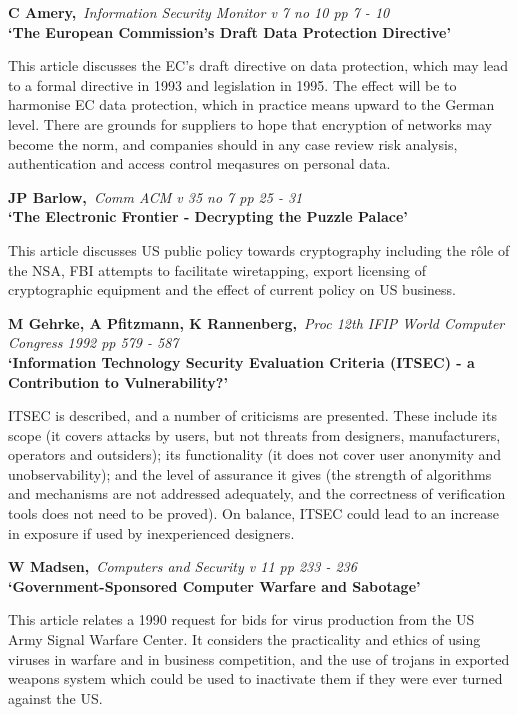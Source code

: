 {\bf \noindent C Amery,}{\em ~Information Security Monitor v 7 no 10 pp 7 -
10\\}
{\bf `The European Commission's Draft Data Protection Directive'}

This article discusses the EC's draft directive on data protection, which may
lead to a formal directive in 1993 and legislation in 1995. The effect will be
to harmonise EC data protection, which in practice means upward to the 
German level. There are grounds for suppliers to hope that encryption of
networks may become the norm, and companies should in any case review risk 
analysis, authentication and access control meqasures on personal data.

{\bf \noindent JP Barlow,}{\em ~Comm ACM v 35 no 7 pp 25 - 31\\}
{\bf `The Electronic Frontier - Decrypting the Puzzle Palace'}

This article discusses US public policy towards cryptography including the
r\^{o}le of the NSA, FBI attempts to facilitate wiretapping, export licensing
of cryptographic equipment and the effect of current policy on US business.

{\bf \noindent M Gehrke, A Pfitzmann, K Rannenberg,}{\em ~Proc 12th IFIP
World Computer Congress 1992 pp 579 - 587\\}
{\bf `Information Technology Security Evaluation Criteria (ITSEC) - a
Contribution to Vulnerability?'}

ITSEC is described, and a number of criticisms are presented. These include
its scope (it covers attacks by users, but not threats from designers,
manufacturers, operators and outsiders); its functionality (it does not
cover user anonymity and unobservability); and the level of assurance it 
gives (the strength of algorithms and mechanisms are not addressed
adequately, and the correctness of verification tools does not need to be
proved). On balance, ITSEC could lead to an increase in exposure if used
by inexperienced designers.

{\bf \noindent W Madsen,}{\em ~Computers and Security v 11 pp 233 - 236\\}
{\bf `Government-Sponsored Computer Warfare and Sabotage'}

This article relates a 1990 request for bids for virus production from the
US Army Signal Warfare Center. It considers the practicality and ethics of
using viruses in warfare and in business competition, and the use of trojans
in exported weapons system which could be used to inactivate them if they
were ever turned against the US.

